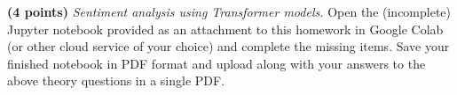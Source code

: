\noindent {}
\textbf{(4 points)} \textit{Sentiment analysis using Transformer models.} Open the (incomplete) Jupyter notebook provided as an attachment to this homework in Google Colab (or other cloud service of your choice) and complete the missing items. Save your finished notebook in PDF format and upload along with your answers to the above theory questions in a single PDF. \\

\noindent {}